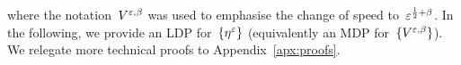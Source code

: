 where the notation~$V^{\varepsilon,\beta}$ was used to emphasise the change of speed to~$\varepsilon^{\frac12+\beta}$. 
In the following, we provide an LDP for~$\{\eta^\varepsilon\}$ (equivalently an MDP for~$\{V^{\varepsilon,\beta}\}$). We relegate more technical proofs to Appendix~\ref{apx:proofs}.

